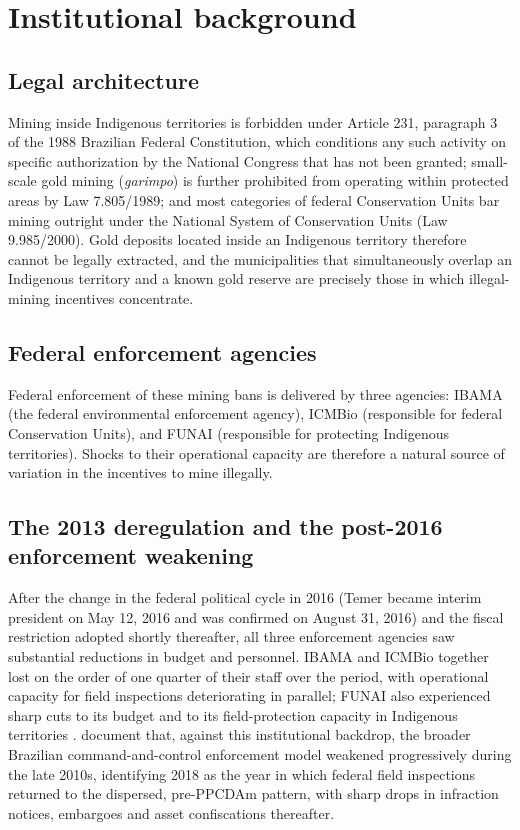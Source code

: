 \documentclass[preprint,12pt]{elsarticle}
\begin{document}
\section{Institutional background}\label{sec:background}

\subsection{Legal architecture}
Mining inside Indigenous territories is forbidden under Article 231, paragraph 3 of the 1988 Brazilian Federal Constitution, which conditions any such activity on specific authorization by the National Congress that has not been granted; small-scale gold mining (\textit{garimpo}) is further prohibited from operating within protected areas by Law 7.805/1989; and most categories of federal Conservation Units bar mining outright under the National System of Conservation Units (Law 9.985/2000). Gold deposits located inside an Indigenous territory therefore cannot be legally extracted, and the municipalities that simultaneously overlap an Indigenous territory and a known gold reserve are precisely those in which illegal-mining incentives concentrate.

\subsection{Federal enforcement agencies}
Federal enforcement of these mining bans is delivered by three agencies: IBAMA (the federal environmental enforcement agency), ICMBio (responsible for federal Conservation Units), and FUNAI (responsible for protecting Indigenous territories). Shocks to their operational capacity are therefore a natural source of variation in the incentives to mine illegally.

\subsection{The 2013 deregulation and the post-2016 enforcement weakening}

After the change in the federal political cycle in 2016 (Temer became interim president on May 12, 2016 and was confirmed on August 31, 2016) and the fiscal restriction adopted shortly thereafter, all three enforcement agencies saw substantial reductions in budget and personnel. IBAMA and ICMBio together lost on the order of one quarter of their staff over the period, with operational capacity for field inspections deteriorating in parallel; FUNAI also experienced sharp cuts to its budget and to its field-protection capacity in Indigenous territories \citep{abessa2019systematic,pereira2020brazilian,branford2017brazil}. \citet{nunes2024lessons} document that, against this institutional backdrop, the broader Brazilian command-and-control enforcement model weakened progressively during the late 2010s, identifying 2018 as the year in which federal field inspections returned to the dispersed, pre-PPCDAm pattern, with sharp drops in infraction notices, embargoes and asset confiscations thereafter.
\end{document}
